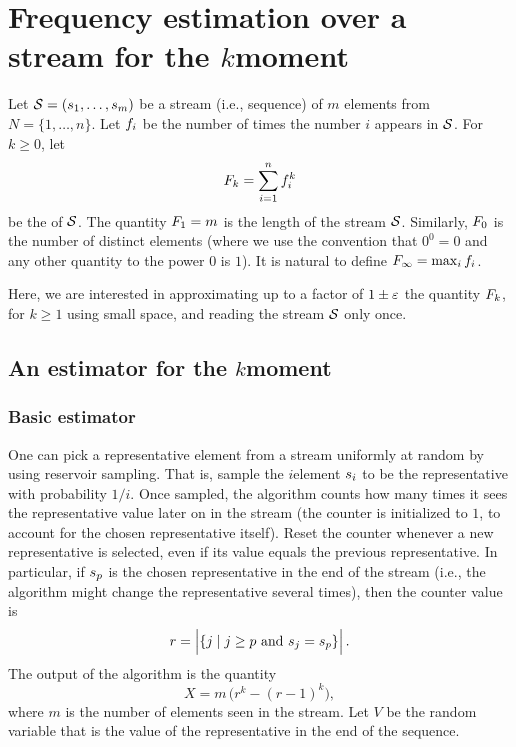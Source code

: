 \section{Frequency estimation over a stream for the %
   $k$\th moment}



Let $\mathcal{S} = ({s}_1, \ldots, {s}_m)$ be a stream (i.e., sequence)
of $m$ elements from $N = \{1,\ldots, n\}$. Let $f_i$ be the number
of times the number $i$ appears in $\mathcal{S}$. For $k \geq 0$, let
\begin{equation*}
    F_k=\sum_{i=1}^n f_i^k
\end{equation*}
be the  of $\mathcal{S}$. The quantity
$F_1=m$ is the length of the stream $\mathcal{S}$. Similarly, $F_0$ is
the number of distinct elements (where we use the convention that
$0^0=0$ and any other quantity to the power $0$ is $1$). It is natural
to define $F_\infty = \max_i f_i$.

Here, we are interested in approximating up to a factor of $1\pm {\varepsilon}$
the quantity $F_k$, for $k\geq 1$ using small space, and reading
the stream $\mathcal{S}$ only once.

\subsection{An estimator for the $k$\th moment}

\subsubsection{Basic estimator}

One can pick a representative element from a stream uniformly at random
by using reservoir sampling. That is, sample the $i$\th element ${s}_i$
to be the representative with probability $1/i$. Once sampled, the
algorithm counts how many times it sees the representative value later on
in the stream (the counter is initialized to $1$, to account for the
chosen representative itself). Reset the counter whenever a new
representative is selected, even if its value equals the previous
representative. In particular, if ${s}_p$ is the chosen representative
in the end of the stream (i.e., the algorithm might change the
representative several times), then the counter value is
\begin{equation*}
    r = \left| { \left\{ j \;\middle\vert\; j \geq p \text{ and } {s}_j = {s}_p \right\}\Bigr.} \right|.
\end{equation*}
The output of the algorithm is the quantity
\begin{equation*}
    X = m\, \bigl( r^k - (r-1)^k \bigr),
\end{equation*}
where $m$ is the number of elements seen in the stream.  Let $V$ be
the random variable that is the value of the representative in the end
of the sequence.



